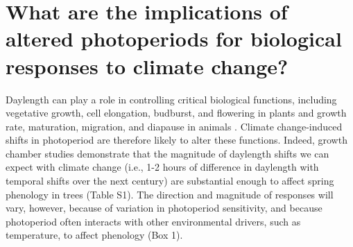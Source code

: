 \documentclass{article}
\begin{document}
\section*{What are the implications of altered photoperiods for biological responses to climate change?}
\par Daylength can play a role in controlling critical biological functions, including vegetative growth, cell elongation, budburst, and flowering in plants \citep{Linkosalo:2006aa,erwin1998,sidaway2010,Hsu:2011,Heide:2011aa,Ashby:1962aa,Heide:2012aa,mimura2007} and growth rate, maturation, migration, and diapause in animals \citep{muir1994,bradshaw2006,saunders1970,tobin2008,zydlewski2014}. Climate change-induced shifts in photoperiod are therefore likely to alter these functions. 
Indeed, growth chamber studies demonstrate that the magnitude of daylength shifts we can expect with climate change (i.e., 1-2 hours of difference in daylength with temporal shifts over the next century) are substantial enough to affect spring phenology in trees (Table S1). The direction and magnitude of responses will vary, however, because of variation in photoperiod sensitivity, and because photoperiod often interacts with other environmental drivers, such as temperature, to affect phenology (Box 1). %
\end{document}
